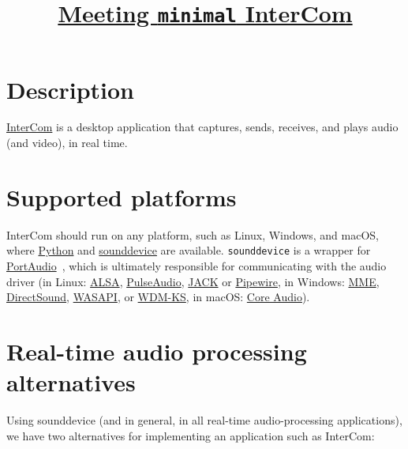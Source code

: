 
\title{\href{https://tecnologias-multimedia.github.io/contents/minimal/}{Meeting \texttt{minimal} InterCom}}

\maketitle
\tableofcontents

\section{Description}

\href{https://github.com/Tecnologias-multimedia/InterCom}{InterCom} is
a desktop application that captures, sends, receives, and plays audio
(and video), in real time.

\section{Supported platforms}

InterCom should run on any platform, such as Linux, Windows, and
macOS, where \href{https://www.python.org/}{Python} and
\href{https://vicente-gonzalez-ruiz.github.io/intro_to_sounddevice/}{sounddevice}
are available. \texttt{sounddevice} is a wrapper for
\href{http://www.portaudio.com/}{PortAudio}~\cite{portaudio}, which is
ultimately responsible for communicating with the audio driver (in
Linux: \href{https://vicente-gonzalez-ruiz.github.io/ALSA/}{ALSA},
\href{https://vicente-gonzalez-ruiz.github.io/PulseAudio/}{PulseAudio},
\href{https://vicente-gonzalez-ruiz.github.io/JACK/}{JACK} or
\href{https://pipewire.org/}{Pipewire}, in Windows: \href{https://en.wikipedia.org/wiki/Windows_legacy_audio_components#Multimedia_Extensions_(MME)}{MME}, \href{https://en.wikipedia.org/wiki/DirectSound}{DirectSound}, \href{https://en.wikipedia.org/wiki/Technical_features_new_to_Windows_Vista#Audio_stack_architecture}{WASAPI}, or \href{https://en.wikipedia.org/wiki/Windows_Driver_Model}{WDM-KS}, in macOS: \href{https://en.wikipedia.org/wiki/Core_Audio}{Core Audio}).

\section{Real-time audio processing alternatives}

Using sounddevice (and in general, in all real-time audio-processing
applications), we have two alternatives for implementing an application
such as InterCom:

